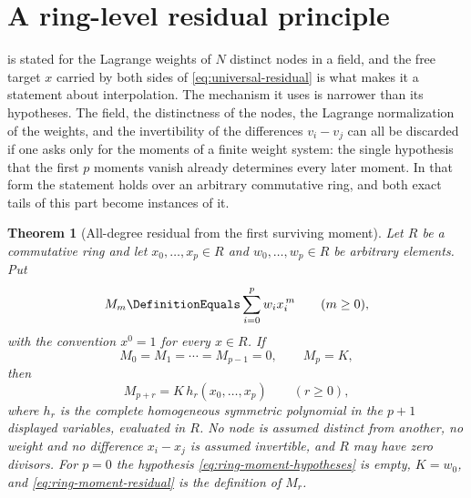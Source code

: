 \documentclass[11pt,a4paper,oneside,openany]{book}
\newtheorem{theorem}{Theorem}[chapter]
\theoremstyle{definition}
\theoremstyle{remark}
\begin{document}
\section{A ring-level residual principle}

 is stated for the Lagrange weights of $N$
distinct nodes in a field, and the free target $x$ carried by both sides of
\eqref{eq:universal-residual} is what makes it a statement about interpolation.
The mechanism it uses is narrower than its hypotheses.  The field, the
distinctness of the nodes, the Lagrange normalization of the weights, and the
invertibility of the differences $v_i-v_j$ can all be discarded if one asks only
for the moments of a finite weight system: the single hypothesis that the first
$p$ moments vanish already determines every later moment.  In that form the
statement holds over an arbitrary commutative ring, and both exact tails of this
part become instances of it.

\begin{theorem}[All-degree residual from the first surviving moment]
\label{thm:ring-moment-residual}
Let $R$ be a commutative ring and let $x_0,\ldots,x_p\in R$ and
$w_0,\ldots,w_p\in R$ be arbitrary elements.  Put
\begin{equation}\label{eq:ring-moment-definition}
 M_m\DefinitionEquals\sum_{i=0}^{p}w_ix_i^{\,m}
 \qquad(m\ge0),
\end{equation}
with the convention $x^0=1$ for every $x\in R$.  If
\begin{equation}\label{eq:ring-moment-hypotheses}
 M_0=M_1=\cdots=M_{p-1}=0,
 \qquad
 M_p=K,
\end{equation}
then
\begin{equation}\label{eq:ring-moment-residual}
 M_{p+r}=K\,h_r(x_0,\ldots,x_p)
 \qquad(r\ge0),
\end{equation}
where $h_r$ is the complete homogeneous symmetric polynomial in the $p+1$
displayed variables, evaluated in $R$.  No node is assumed distinct from another,
no weight and no difference $x_i-x_j$ is assumed invertible, and $R$ may have
zero divisors.  For $p=0$ the hypothesis \eqref{eq:ring-moment-hypotheses} is
empty, $K=w_0$, and \eqref{eq:ring-moment-residual} is the definition of $M_r$.
\end{theorem}
\end{document}
